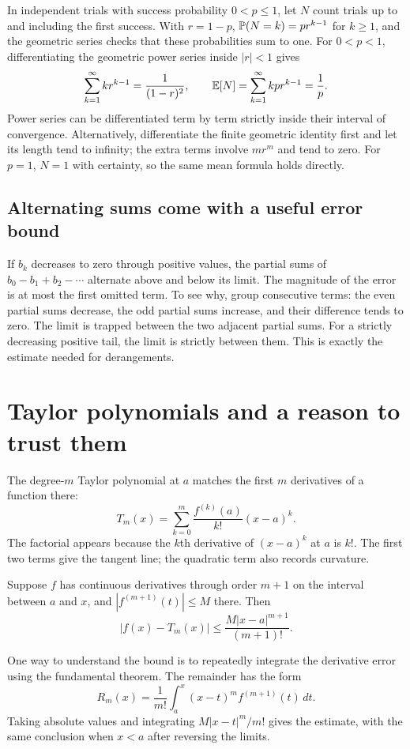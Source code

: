 \begin{example}
In independent trials with success probability $0<p\le1$, let $N$
count trials up to and including the first success. With $r=1-p$,
$\P(N=k)=pr^{k-1}$ for $k\ge1$, and the geometric series checks
that these probabilities sum to one. For $0<p<1$, differentiating
the geometric power series inside $|r|<1$ gives
\[
 \sum_{k=1}^{\infty}kr^{k-1}=\frac1{(1-r)^2},\qquad
 \E[N]=\sum_{k=1}^{\infty}kpr^{k-1}=\frac1p.
\]
Power series can be differentiated term by term strictly inside their
interval of convergence. Alternatively, differentiate the finite
geometric identity first and let its length tend to infinity;
the extra terms involve $m r^m$ and tend to zero.
For $p=1$, $N=1$ with certainty, so the same mean formula holds directly.
\end{example}

\subsection*{Alternating sums come with a useful error bound}
If $b_k$ decreases to zero through positive values, the partial sums of
$b_0-b_1+b_2-\cdots$ alternate above and below its limit.
The magnitude of the error is at most the first omitted term. To see
why, group consecutive terms: the even partial sums decrease, the odd
partial sums increase, and their difference tends to zero. The limit is
trapped between the two adjacent partial sums.
For a strictly decreasing positive tail, the limit is strictly between them.
This is exactly the estimate needed for derangements.

\section{Taylor polynomials and a reason to trust them}
\label{sec:calc-taylor}

The degree-$m$ Taylor polynomial at $a$ matches the first $m$ derivatives
of a function there:
\[
 T_m(x)=\sum_{k=0}^m\frac{f^{(k)}(a)}{k!}(x-a)^k.
\]
The factorial appears because the $k$th derivative of $(x-a)^k$ at
$a$ is $k!$. The first two terms give the tangent line; the quadratic
term also records curvature.

\begin{theorem}
Suppose $f$ has continuous derivatives through order $m+1$ on the
interval between $a$ and $x$, and $|f^{(m+1)}(t)|\le M$ there.
Then
\[
 |f(x)-T_m(x)|\le\frac{M|x-a|^{m+1}}{(m+1)!}.
\]
\end{theorem}
One way to understand the bound is to repeatedly integrate the derivative
error using the fundamental theorem. The remainder has the form
\[
 R_m(x)=\frac1{m!}\int_a^x (x-t)^m f^{(m+1)}(t)\,dt.
\]
Taking absolute values and integrating $M|x-t|^m/m!$ gives the estimate,
with the same conclusion when $x<a$ after reversing the limits.


